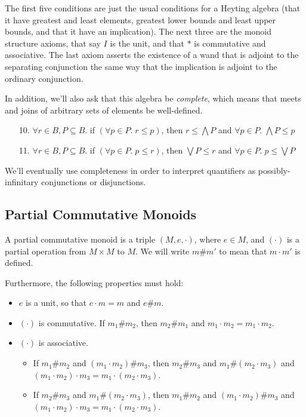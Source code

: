 The first five conditions are just the usual conditions for a Heyting
algebra (that it have greatest and least elements, greatest lower
bounds and least upper bounds, and that it have an implication). The
next three are the monoid structure axioms, that say $I$ is the unit,
and that $*$ is commutative and associative. The last axiom asserts
the existence of a wand that is adjoint to the separating conjunction
the same way that the implication is adjoint to the ordinary
conjunction.

In addition, we'll also ask that this algebra be \emph{complete},
which means that meets and joins of arbitrary sets of elements be
well-defined.

\begin{enumerate}
\item[10.] $\forall r\in B, P \subseteq B.$ if $(\forall p \in P.\; r \leq p)$, then  
      $r \leq \bigwedge P $ and 
      $\forall p \in P.\; \bigwedge P \leq p$
\item[11.] $\forall r \in B, P \subseteq B.$ if $(\forall p \in P.\; p \leq r)$, then  
      $\bigvee P \leq r$ and 
      $\forall p \in P.\; p \leq \bigvee P$
\end{enumerate}

We'll eventually use completeness in order to interpret quantifiers as 
possibly-infinitary conjunctions or disjunctions.
 
\subsection{Partial Commutative Monoids}

A partial commutative monoid is a triple $(M, e, \cdot)$, where $e \in
M$, and $(\cdot)$ is a partial operation from $M \times M$ to $M$. We
will write $m \# m'$ to mean that $m \cdot m'$ is defined. 

Furthermore, the following properties must hold:

\begin{itemize}
\item $e$ is a unit, so that $e \cdot m = m$ and $e \# m$. 
\item $(\cdot)$ is commutative. If $m_1 \# m_2$, then $m_2 \# m_1$ and $m_1 \cdot m_2 = m_1 \cdot m_2$. 
\item $(\cdot)$ is associative. 
  \begin{itemize}
  \item If $m_1 \# m_2$ and $(m_1 \cdot m_2) \# m_3$, then $m_2 \# m_3$ and $m_1 \# (m_2 \cdot m_3)$ and $(m_1 \cdot m_2) \cdot m_3 = m_1 \cdot (m_2 \cdot m_3)$.
  \item If $m_2 \# m_3$ and $m_1 \# (m_2 \cdot m_3)$, then $m_1 \# m_2$ and $(m_1 \cdot m_2) \# m_3$ and $(m_1 \cdot m_2) \cdot m_3 = m_1 \cdot (m_2 \cdot m_3)$.
  \end{itemize}
  
  
\end{itemize}


